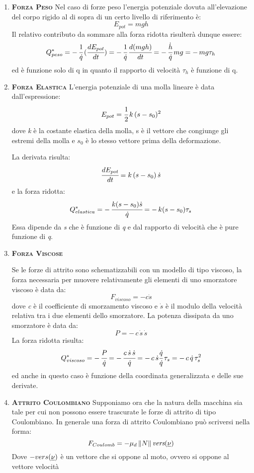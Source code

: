 	\begin{enumerate}
	\item {\scshape{\bfseries Forza Peso}}
		Nel caso di forze peso l'energia potenziale dovuta all'elevazione del corpo rigido al di sopra di un certo livello di riferimento è:
		\[E_{pot} = mgh\]
		Il relativo contributo da sommare alla forza ridotta risulterà dunque essere:
		\[
		Q^*_{peso} = -\,\cfrac{1}{\dot{q}}\,(\cfrac{dE_{pot}}{dt}) = -\,\cfrac{1}{\dot{q}}\,\cfrac{d(mgh)}{dt} = -\,\cfrac{\dot{h}}{\dot{q}}\,mg = -\,mg\tau_h
		\]
		ed è funzione solo di q in quanto il rapporto di velocità $\tau_h$ è funzione di q.
	\item  {\scshape{\bfseries Forza Elastica}}
	L'energia potenziale di una molla lineare è data dall'espressione:
	\[
	E_{pot} = \cfrac{1}{2}\,k\,(s-s_0)^2
	\]
	dove \emph{k} è la costante elastica della molla, s è il vettore che congiunge gli estremi della molla e $s_0$ è lo stesso vettore prima della deformazione.
	
	La derivata risulta:
	\[
	\cfrac{dE_{pot}}{dt} = k\,(s-s_0)\,\dot{s}
	\]
	e la forza ridotta:
	\[
	Q^*_{elastica} = -\,\cfrac{k(s-s_0)\dot{s}}{\dot{q}} =-\, k(s-s_0)\tau_s
	\]
	Essa dipende da \emph{s} che è funzione di \emph{q} e dal rapporto di velocità che è pure funzione di \emph{q}.
	
	\item  {\scshape{\bfseries Forza Viscose}}
	
	Se le forze di attrito sono schematizzabili con un modello di tipo viscoso, la forza necessaria per muovere relativamente gli elementi di uno smorzatore viscoso è data da:
	\[
	F_{viscoso} = - c\dot{s}
	\]
	dove \emph{c} è il coefficiente di smorzamento viscoso e $\dot{s}$ è il modulo della velocità relativa tra i due elementi dello smorzatore. La potenza dissipata da uno smorzatore è data da:
	\[
	P = -\,c\,\dot{s}\,\dot{s}
	\]
	La forza ridotta risulta:
	\[
	Q^*_{viscoso} = -\,\cfrac{P}{\dot{q}} = -\,\cfrac{c\,\dot{s}\,\dot{s}}{\dot{q}} = -\,c\,\dot{s}\cfrac{\dot{q}}{\dot{q}}\,\tau_s = -\,c\,\dot{q}\,\tau_s^2
	\]
	ed anche in questo caso è funzione della coordinata generalizzata e delle sue derivate.
	
	\item  {\scshape{\bfseries Attrito Coulombiano}}
	Supponiamo ora che la natura della macchina sia tale per cui non possono essere trascurate le forze di attrito di tipo Coulombiano. In generale una forza di attrito Coulombiano può scriversi nella forma:
	\[
	F_{Coulomb} = - \mu_d\,\lVert N\rVert\,\emph{vers}(\underline{\nu})
	\]
	Dove $-vers(\underline{\nu})$ è un vettore che si oppone al moto, ovvero si oppone al vettore velocità
	

\end{enumerate}
